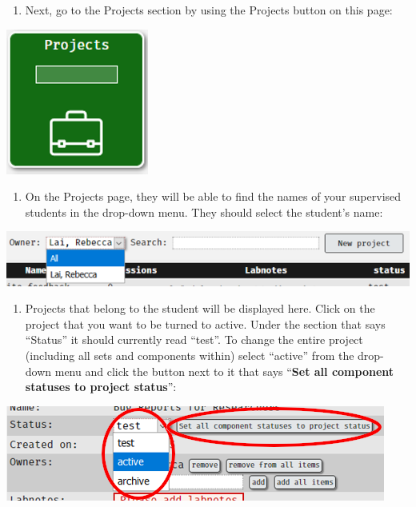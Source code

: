 \documentclass[]{book}
\providecommand{\tightlist}{%
  \setlength{\itemsep}{0pt}\setlength{\parskip}{0pt}}
\begin{document}
\begin{enumerate}
\def\labelenumi{\arabic{enumi}.}
\setcounter{enumi}{2}
\tightlist
\item
  Next, go to the Projects section by using the Projects button on this
  page:
\end{enumerate}

\includegraphics{images/screenshots/active2.png}

\begin{enumerate}
\def\labelenumi{\arabic{enumi}.}
\setcounter{enumi}{3}
\tightlist
\item
  On the Projects page, they will be able to find the names of your
  supervised students in the drop-down menu. They should select the
  student's name:
\end{enumerate}

\includegraphics{images/screenshots/active3.png}

\begin{enumerate}
\def\labelenumi{\arabic{enumi}.}
\setcounter{enumi}{4}
\tightlist
\item
  Projects that belong to the student will be displayed here. Click on
  the project that you want to be turned to active. Under the section
  that says ``Status'' it should currently read ``test''. To change the
  entire project (including all sets and components within) select
  ``active'' from the drop-down menu and click the button next to it
  that says ``\textbf{Set all component statuses to project status}'':
\end{enumerate}

\includegraphics{images/screenshots/active4.png}
\end{document}
